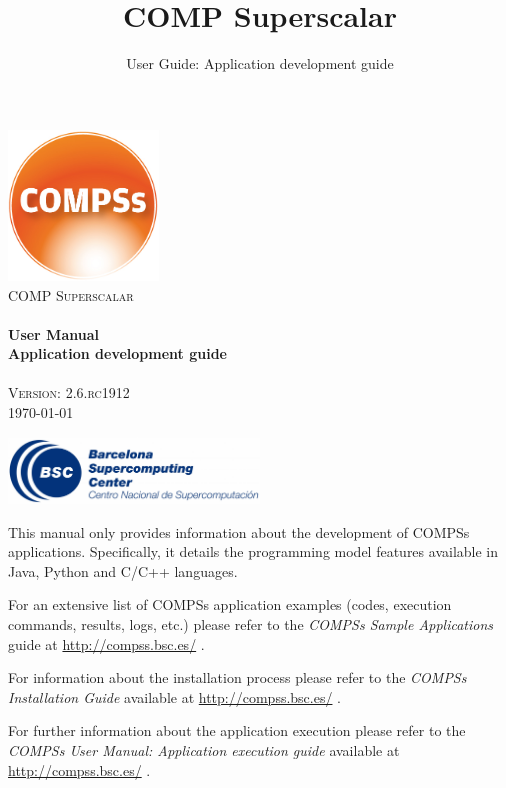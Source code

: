 \documentclass[a4paper,12pt]{article}
\title{COMP Superscalar}
\author{User Guide: Application development guide}
\def \compssversion {2.6.rc1912}
\begin{document}
  \hypersetup{pageanchor=false}
  \begin{titlepage} 
    \begin{center} 
      \includegraphics[width=0.3\textwidth]{./Figures/Logos/degradado-naranja-compss.jpg}~\\[1cm] 
      \textsc{\LARGE COMP Superscalar}\\[1.5cm] 
      
      \HRule \\[0.4cm] 
      { \huge \bfseries User Manual \\[0.4cm] }
      { \large \bfseries Application development guide \\[0.4cm] } 
      \HRule \\[1.5cm] 

      { \large \textsc{Version: \compssversion}} \\[0.3cm]
      { \large \today }

      \vfill 
      \includegraphics[width=0.5\textwidth]{./Figures/bsc_280.jpg}~\\[1cm]
    \end{center} 
  \end{titlepage}
  \hypersetup{pageanchor=true}
  
  {
    This manual only provides information about the development of COMPSs applications. Specifically, it details
    the programming model features available in Java, Python and C/C++ languages. 
    \newline
    
    For an extensive list of COMPSs application examples (codes, execution commands, results, logs, etc.) please refer to the \textit{COMPSs Sample 
    Applications} guide at \url{http://compss.bsc.es/} .
    \newline
    
    For information about the installation process please refer to the \textit{COMPSs Installation Guide} available at
    \url{http://compss.bsc.es/} .
    \newline
    
    For further information about the application execution please refer to the \textit{COMPSs User Manual: Application execution 
    guide} available at \url{http://compss.bsc.es/} .
    \newline
  }
  
\end{document}
